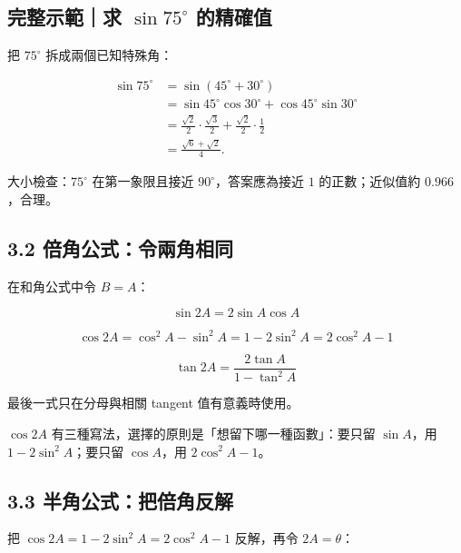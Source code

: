 \documentclass[11pt,a4paper]{article}
\begin{document}
\begin{HandoutWorkedExample}

\subsection{\texorpdfstring{完整示範｜求 \(\sin75^\circ\) 的精確值}{完整示範｜求 \textbackslash sin75\^{}\textbackslash circ 的精確值}}\label{ux5b8cux6574ux793aux7bc4ux6c42-sin75circ-ux7684ux7cbeux78baux503c}

把 \(75^\circ\) 拆成兩個已知特殊角：

\[
\begin{aligned}
\sin75^\circ
&=\sin(45^\circ+30^\circ)\\
&=\sin45^\circ\cos30^\circ
 +\cos45^\circ\sin30^\circ\\
&=\frac{\sqrt2}{2}\cdot\frac{\sqrt3}{2}
 +\frac{\sqrt2}{2}\cdot\frac12\\
&=\boxed{\frac{\sqrt6+\sqrt2}{4}}.
\end{aligned}
\]

大小檢查：\(75^\circ\) 在第一象限且接近 \(90^\circ\)，答案應為接近 \(1\) 的正數；近似值約 \(0.966\)，合理。

\end{HandoutWorkedExample}

\subsection{3.2 倍角公式：令兩角相同}\label{ux500dux89d2ux516cux5f0fux4ee4ux5169ux89d2ux76f8ux540c}

在和角公式中令 \(B=A\)：

\[
\boxed{\sin2A=2\sin A\cos A}
\]

\[
\boxed{\cos2A=\cos^2A-\sin^2A
=1-2\sin^2A
=2\cos^2A-1}
\]

\[
\boxed{\tan2A=\frac{2\tan A}{1-\tan^2A}}
\]

最後一式只在分母與相關 tangent 值有意義時使用。

\(\cos2A\) 有三種寫法，選擇的原則是「想留下哪一種函數」：要只留 \(\sin A\)，用 \(1-2\sin^2A\)；要只留 \(\cos A\)，用 \(2\cos^2A-1\)。

\subsection{3.3 半角公式：把倍角反解}\label{ux534aux89d2ux516cux5f0fux628aux500dux89d2ux53cdux89e3}

把 \(\cos2A=1-2\sin^2A=2\cos^2A-1\) 反解，再令 \(2A=\theta\)：
\end{document}
